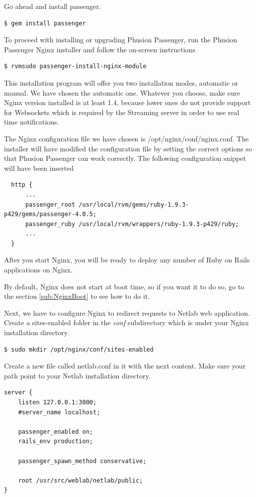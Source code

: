 \documentclass{article}
\begin{document}
Go ahead and install passenger.
\begin{verbatim}
$ gem install passenger
\end{verbatim}

To proceed with installing or upgrading Phusion Passenger, run the Phusion Passenger Nginx installer and follow the on-screen instructions

\begin{verbatim}
$ rvmsudo passenger-install-nginx-module
\end{verbatim}

This installation program will offer you two installation modes, automatic or manual. We have chosen the automatic one. Whatever you choose, make sure Nginx version installed is at least 1.4, because lower ones do not provide support for Websockets which is required by the Streaming server in order to use real time notifications.

The Nginx configuration file we have chosen is /opt/nginx/conf/nginx.conf. The installer will have modified the configuration file by setting the correct options so that Phusion Passenger can work correctly. The following configuration snippet will have been inserted

\begin{verbatim}
  http {
      ...
      passenger_root /usr/local/rvm/gems/ruby-1.9.3-p429/gems/passenger-4.0.5;
      passenger_ruby /usr/local/rvm/wrappers/ruby-1.9.3-p429/ruby;
      ...
  }
\end{verbatim}

After you start Nginx, you will be ready to deploy any number of Ruby on Rails applications on Nginx.

By default, Nginx does not start at boot time, so if you want it to do so, go to the section \ref{sub:NginxBoot} to see how to do it.

Next, we have to configure Nginx to redirect requests to Netlab web application. Create a sites-enabled folder in the \textit{conf} subdirectory which is under your Nginx installation directory.

\begin{verbatim}
$ sudo mkdir /opt/nginx/conf/sites-enabled
\end{verbatim}

Create a new file called netlab.conf in it with the next content. Make sure your path point to your Netlab installation directory.

\begin{verbatim}
server {
    listen 127.0.0.1:3000;
    #server_name localhost;

    passenger_enabled on;
    rails_env production;

    passenger_spawn_method conservative;

    root /usr/src/weblab/netlab/public;
}
\end{verbatim}
\end{document}
